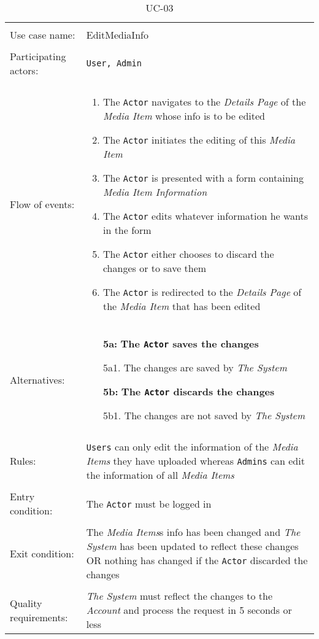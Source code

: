 \noindent
\begin{table}[h!]
\caption{UC-03}
\label{UC-03}
\centering
\begin{tabular}{ l  p{8cm} }  
\hline
\\
Use case name:  & EditMediaInfo   \\   \hline    
\\            
Participating actors:  & \texttt{\texttt{User}, \texttt{Admin}} \\   \hline   
\\             
Flow of events: & \begin{enumerate}
\item{The \texttt{Actor} navigates to the \textit{Details Page} of the \textit{Media Item} whose info is to be edited}
\item{The \texttt{Actor} initiates the editing of this \textit{Media Item}}
\item{The \texttt{Actor} is presented with a form containing \textit{Media Item Information}}
\item{The \texttt{Actor} edits whatever information he wants in the form}
\item{The \texttt{Actor} either chooses to discard the changes or to save them}
\item{The \texttt{Actor} is redirected to the \textit{Details Page} of the \textit{Media Item} that has been edited}
\end{enumerate}
\\
Alternatives: & \begin{itemize}
\item[\textbf{5a:}]{\textbf{The \texttt{Actor} saves the changes}}
\item[]  5a1. The changes are saved by \textit{The System}
\item[\textbf{5b:}]{\textbf{The \texttt{Actor} discards the changes}}
\item[]  5b1. The changes are not saved by \textit{The System}
\end{itemize}
\\ \hline
\\
Rules: & \texttt{Users} can only edit the information of the \textit{Media Items} they have uploaded whereas \texttt{Admins} can edit the information of all \textit{Media Items}
\\   \hline 
\\
Entry condition: & The \texttt{Actor} must be logged in \\ \hline
\\
Exit condition: & The \textit{Media Items}s info has been changed and \textit{The System} has been updated to reflect these changes OR
nothing has changed if the \texttt{Actor} discarded the changes \\ \hline
\\
Quality requirements: & \textit{The System} must reflect the changes to the \textit{Account} and process the request in 5 seconds or less \\ \hline  
\end{tabular}
\end{table}

